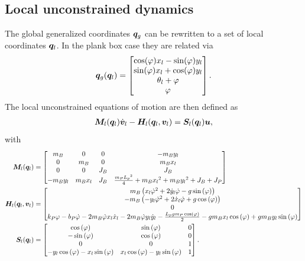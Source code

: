 \documentclass[../DC2017114Bouma.tex]{subfiles}
\begin{document}
\subsection*{Local unconstrained dynamics}
The global generalized coordinates ${\boldsymbol{q}}_g$ can be rewritten to a set of local coordinates ${\boldsymbol{q}}_l$. In the plank box case they are related via
\begin{equation}
{\boldsymbol{q}}_g({\boldsymbol{q}}_l) = \begin{bmatrix}
\cos(\varphi)x_l-\sin(\varphi)y_l\\
\sin(\varphi)x_l+\cos(\varphi)y_l\\
\theta_l+\varphi\\
\varphi
\end{bmatrix}.
\end{equation}
The local unconstrained equations of motion are then defined as
\begin{align}
{\boldsymbol{M}}_l({\boldsymbol{q}}_l)\dot{{\boldsymbol{v}}}_l - {\boldsymbol{H}}_l({\boldsymbol{q}}_l,{\boldsymbol{v}}_l) = {\boldsymbol{S}}_l({\boldsymbol{q}}_l){\boldsymbol{u}},
\end{align}
with
\begin{align}
{\boldsymbol{M}}_l({\boldsymbol{q}}_l) &= \begin{bmatrix}
m_B & 0 & 0 & -m_By_l\\ 0 & m_B & 0 & m_Bx_l\\ 0 & 0 & J_B & J_B\\ -m_By_l & m_Bx_l & J_B & \frac{m_P{L_p}^2}{4}+m_B{x_l}^2+m_B{y_l}^2+J_B+J_P
\end{bmatrix} \\
{\boldsymbol{H}}_l({\boldsymbol{q}}_l,{\boldsymbol{v}}_l) &= \begin{bmatrix}
m_B\left(x_l{\dot{\varphi}}^2+2\dot{y}_l\dot{\varphi}-g\sin\left(\varphi \right)\right)\\ -m_B\left(-y_l{\dot{\varphi}}^2+2\dot{x}_l\dot{\varphi}+g\cos\left(\varphi \right)\right)\\ 0\\ k_P\varphi -b_P\dot{\varphi}-2m_B\dot{\varphi}x_l\dot{x}_l-2m_B\dot{\varphi}y_l\dot{y}_l-\frac{L_pgm_P\cos\left(\varphi \right)}{2}-gm_Bx_l\cos\left(\varphi \right)+gm_By_l\sin\left(\varphi \right)
\end{bmatrix} \\
{\boldsymbol{S}}_l({\boldsymbol{q}}_l) &= \begin{bmatrix}
\cos\left(\varphi \right) & \sin\left(\varphi \right) & 0\\ -\sin\left(\varphi \right) & \cos\left(\varphi \right) & 0\\ 0 & 0 & 1\\ -y_l\cos\left(\varphi \right)-x_l\sin\left(\varphi \right) & x_l\cos\left(\varphi \right)-y_l\sin\left(\varphi \right) & 1
\end{bmatrix}.
\end{align}
\end{document}
